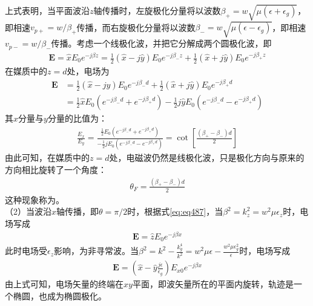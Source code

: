 \documentclass{article}
\numberwithin{equation}{section}
\begin{document}
上式表明，当平面波沿$z$轴传播时，左旋极化分量将以波数$\beta_+=w\sqrt{\mu(\epsilon+\epsilon_g)}$，即相速$v_{p+}=w/\beta_+$传播，而右旋极化分量将以波数$\beta_-=w\sqrt{\mu(\epsilon-\epsilon_g)}$，即相速$v_{p-}=w/\beta_-$传播。考虑一个线极化波，并把它分解成两个圆极化波，即
\begin{align}
    \label{eq:eq495}
    \mathbf{E}=\hat{x}E_0e^{-j\beta z}=\frac{1}{2}(\hat{x}-j\hat{y})E_0e^{-j\beta_- z}+\frac{1}{2}(\hat{x}+j\hat{y})E_0e^{-j\beta_+ z}
\end{align}
在媒质中的$z=d$处，电场为
\begin{align}
    \label{eq:eq496}
    \mathbf{E}&=\frac{1}{2}(\hat{x}-j\hat{y})E_0e^{-j\beta_- d}+\frac{1}{2}(\hat{x}+j\hat{y})E_0e^{-j\beta_+ d} \\
              &=\frac{1}{2}\hat{x}E_0(e^{-j\beta_- d}+e^{-j\beta_+ d})-\frac{1}{2}j\hat{y}E_0(e^{-j\beta_- d}-e^{-j\beta_+ d})
\end{align}
其$x$分量与$y$分量的比值为：
\begin{align}
    \label{eq:eq497}
    \frac{E_x}{E_y}=\frac{\frac{1}{2}E_0(e^{-j\beta_- d}+e^{-j\beta_+ d})}{-\frac{1}{2}jE_0(e^{-j\beta_- d}-e^{-j\beta_+ d})}=\cot\left[\frac{(\beta_+-\beta_-)d}{2}\right]
\end{align}
由此可知，在媒质中的$z=d$处，电磁波仍然是线极化波，只是极化方向与原来的方向相比旋转了一个角度：
\begin{align}
    \label{eq:eq498}
    \theta_F=\frac{(\beta_+-\beta_-)d}{2}
\end{align}
这种现象称为\textbf{\color{blue}{法拉第旋转}}。\\
（2）当波沿$x$轴传播，即$\theta=\pi/2$时，根据式\ref{eq:eq487}，当$\beta^2=k_z^2=w^2\mu\epsilon_z$时，电场写成
\begin{align}
    \label{eq:eq499}
    \mathbf{E}=\hat{z}E_0e^{-j\beta x}
\end{align}
此时电场受$\epsilon_z$影响，为非寻常波。当$\beta^2=k^2-\frac{k_g^4}{k^2}=w^2\mu\epsilon-\frac{w^2\mu\epsilon_g^2}{\epsilon}$时，电场写成
\begin{align}
    \label{eq:eq500}
    \mathbf{E}=(\hat{x}-\hat{y}\frac{j\epsilon}{\epsilon_g})E_{x0}e^{-j\beta x}
\end{align}
由上式可知，电场矢量的终端在$xy$平面，即波矢量所在的平面内旋转，轨迹是一个椭圆，也成为椭圆极化。
\end{document}
